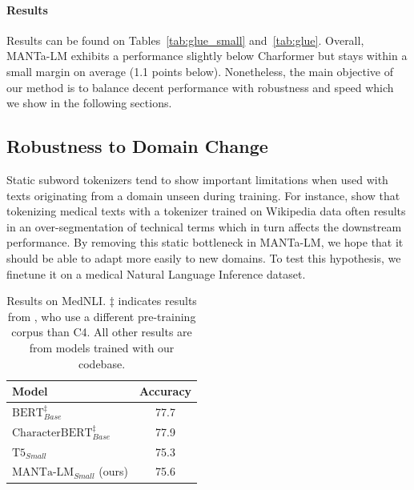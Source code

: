 \paragraph{Results} Results can be found on Tables~\ref{tab:glue_small} and~\ref{tab:glue}. Overall, MANTa-LM exhibits a performance slightly below Charformer but stays within a small margin on average (1.1 points below). Nonetheless, the main objective of our method is to balance decent performance with robustness and speed which we show in the following sections.



\subsection{Robustness to Domain Change}
Static subword tokenizers tend to show important limitations when used with texts originating from a domain unseen during training. For instance, \citet{el-boukkouri-etal-2020-characterbert} show that tokenizing medical texts with a tokenizer trained on Wikipedia data often results in an over-segmentation of technical terms which in turn affects the downstream performance. By removing this static bottleneck in MANTa-LM, we hope that it should be able to adapt more easily to new domains. To test this hypothesis, we finetune it on a medical Natural Language Inference dataset.

\begin{table}[t]
\centering\small
\begin{tabular}{lc}
\toprule
Model                                   & Accuracy  \\ \midrule
$\text{BERT}_{Base}^\ddagger$           & 77.7      \\
$\text{CharacterBERT}_{Base}^\ddagger$  & 77.9      \\
$\text{T5}_{Small}$                     & 75.3      \\ 
$\text{MANTa-LM}_{Small}$ (ours)     & 75.6      \\\bottomrule
\end{tabular}
\caption{Results on MedNLI. $\ddagger$ indicates results from \citet{el-boukkouri-etal-2020-characterbert}, who use a different pre-training corpus than C4. All other results are from models trained with our codebase.}
\label{tab:mednli}
\end{table}

